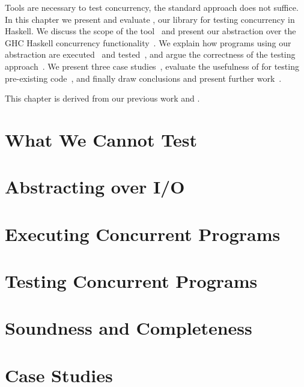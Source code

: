 \chapstart Tools are necessary to test concurrency, the standard approach does
not suffice.  In this chapter we present and evaluate \dejafu{}, our library for
testing concurrency in Haskell.  We discuss the scope of the
tool~ and present our abstraction over the GHC Haskell
concurrency functionality~.  We explain how programs
using our abstraction are executed~ and
tested~, and argue the correctness of the testing
approach~.  We present three case
studies~, evaluate the usefulness of \dejafu{} for
testing pre-existing code~, and finally draw conclusions
and present further work~.

This chapter is derived from our previous work \cite{walker2015} and
\cite{YCS-2016-503}.

\section{What We Cannot Test}
\label{sec:dejafu-scope}

\blindtext

\section{Abstracting over I/O}
\label{sec:dejafu-monadconc}

\blindtext

\section{Executing Concurrent Programs}
\label{sec:dejafu-execution}

\blindtext

\section{Testing Concurrent Programs}
\label{sec:dejafu-testing}

\blindtext

\section{Soundness and Completeness}
\label{sec:dejafu-correctness}

\blindtext

\section{Case Studies}
\label{sec:dejafu-casestudies}

